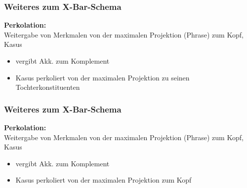 \begin{frame}
\frametitle{Weiteres zum X-Bar-Schema}

\begin{minipage}[b]{0.5\textwidth}
	\textbf{Perkolation:}\\
	 Weitergabe von Merkmalen von der maximalen Projektion (Phrase) zum Kopf, \zB Kasus
	 \begin{itemize}
	 	\item {} vergibt Akk. zum Komplement
	 	\item Kasus perkoliert von der maximalen Projektion zu seinen Tochterkonstituenten
	 \end{itemize}
\end{minipage}  
%
%
\begin{minipage}[b]{0.45\textwidth}
	\centering
\end{minipage}  

\end{frame}


\begin{frame}
\frametitle{Weiteres zum X-Bar-Schema}

\begin{minipage}[b]{0.5\textwidth}
	\textbf{Perkolation:}\\
	 Weitergabe von Merkmalen von der maximalen Projektion (Phrase) zum Kopf, \zB Kasus
	 \begin{itemize}
	 	\item {} vergibt Akk. zum Komplement
	 	\item Kasus perkoliert von der maximalen Projektion zum Kopf
	 \end{itemize}

\end{minipage}  
%
%         
\begin{minipage}[b]{0.45\textwidth}
	\centering
\end{minipage}  

\end{frame}


